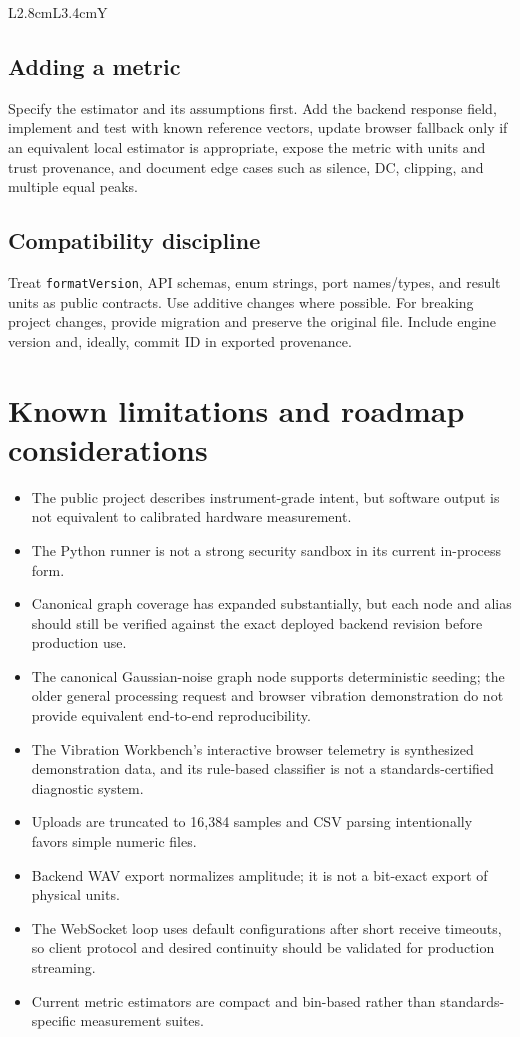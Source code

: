 \documentclass[10pt,a4paper]{article}
\newcommand{\code}[1]{\nolinkurl{#1}}
\begin{document}
\begin{tabularx}{\textwidth}{L{2.8cm}L{3.4cm}Y}
\subsection{Adding a metric}

Specify the estimator and its assumptions first. Add the backend response field, implement and test with known reference vectors, update browser fallback only if an equivalent local estimator is appropriate, expose the metric with units and trust provenance, and document edge cases such as silence, DC, clipping, and multiple equal peaks.

\subsection{Compatibility discipline}

Treat \code{formatVersion}, API schemas, enum strings, port names/types, and result units as public contracts. Use additive changes where possible. For breaking project changes, provide migration and preserve the original file. Include engine version and, ideally, commit ID in exported provenance.

\section{Known limitations and roadmap considerations}

\begin{itemize}
  \item The public project describes instrument-grade intent, but software output is not equivalent to calibrated hardware measurement.
  \item The Python runner is not a strong security sandbox in its current in-process form.
  \item Canonical graph coverage has expanded substantially, but each node and alias should still be verified against the exact deployed backend revision before production use.
  \item The canonical Gaussian-noise graph node supports deterministic seeding; the older general processing request and browser vibration demonstration do not provide equivalent end-to-end reproducibility.
  \item The Vibration Workbench's interactive browser telemetry is synthesized demonstration data, and its rule-based classifier is not a standards-certified diagnostic system.
  \item Uploads are truncated to 16,384 samples and CSV parsing intentionally favors simple numeric files.
  \item Backend WAV export normalizes amplitude; it is not a bit-exact export of physical units.
  \item The WebSocket loop uses default configurations after short receive timeouts, so client protocol and desired continuity should be validated for production streaming.
  \item Current metric estimators are compact and bin-based rather than standards-specific measurement suites.
\end{itemize}


\end{tabularx}
\end{document}
